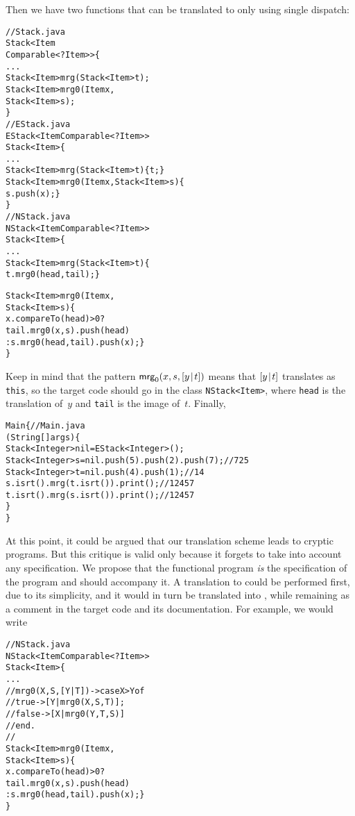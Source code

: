 Then we have two functions that can be translated to \Java only using
single dispatch:
\begin{alltt}
// Stack.java
\public \abstractX \class Stack<Item
\hfill\extends Comparable<? \super Item>> \{
  ...
  \public \abstractX Stack<Item> mrg(\final Stack<Item> t);
  \public \abstractX Stack<Item> mrg0(\final Item x,
                                   \final Stack<Item> s);
\}
// EStack.java
\public \class EStack<Item \extends Comparable<? \super Item>> 
       \extends Stack<Item> \{
  ...
  \public Stack<Item> mrg(\final Stack<Item> t) \{ \return t; \}
  \public Stack<Item> mrg0(\final\! Item x,\final Stack<Item> s)\{
    \return s.push(x); \}
\}
// NStack.java
\public \class NStack<Item \extends Comparable<? \super Item>>
       \extends Stack<Item> \{
  ...
  \public Stack<Item> mrg(\final Stack<Item> t) \{
    \return t.mrg0(head,tail); \}

  \public Stack<Item> mrg0(\final Item x,
                          \final Stack<Item> s) \{
    \return x.compareTo(head) > 0 ?
           tail.mrg0(x,s).push(head)
         : s.mrg0(head,tail).push(x); \}
\}
\end{alltt}
Keep in mind that the pattern \(\textsf{mrg}_0(x,s,[{y}\!\mid\!{t}])\) means
that \([{y}\!\mid\!{t}]\) translates as \texttt{this}, so the target code
should go in the class \texttt{NStack<Item>}, where \texttt{head} is
the translation of~\(y\) and \texttt{tail} is the image of~\(t\).
Finally,
\begin{alltt}
\public \class Main \{\hfill // Main.java
  \public \static \void \main (String[] args) \{
    Stack<Integer> nil = \new EStack<Integer>();
    Stack<Integer> s = nil.push(5).push(2).push(7);\hfill// 7 2 5
    Stack<Integer> t = nil.push(4).push(1);\hfill// 1 4
    s.isrt().mrg(t.isrt()).print();\hfill// 1 2 4 5 7
    t.isrt().mrg(s.isrt()).print();\hfill// 1 2 4 5 7
  \}
\}
\end{alltt}
At this point, it could be argued that our translation scheme leads to
cryptic \Java programs. But this critique is valid only because it
forgets to take into account any specification. We propose that the
functional program \emph{is} the specification of the \Java program
and should accompany it. A translation to \Erlang could be performed
first, due to its simplicity, and it would in turn be translated into
\Java, while remaining as a comment in the target code and its
documentation. For example, we would write
\begin{alltt}
// NStack.java
\public \class NStack<Item \extends Comparable<? \super Item>>
       \extends Stack<Item> \{
  ...
  // mrg0(X,S,[Y|T]) -> case X > Y of
  //                      true  -> [Y|mrg0(X,S,T)];
  //                      false -> [X|mrg0(Y,T,S)]
  //                    end.
  //
  \public Stack<Item> mrg0(\final Item x,
                          \final Stack<Item> s) \{
    \return x.compareTo(head) > 0 ?
           tail.mrg0(x,s).push(head)
         : s.mrg0(head,tail).push(x); \}
\}
\end{alltt}
